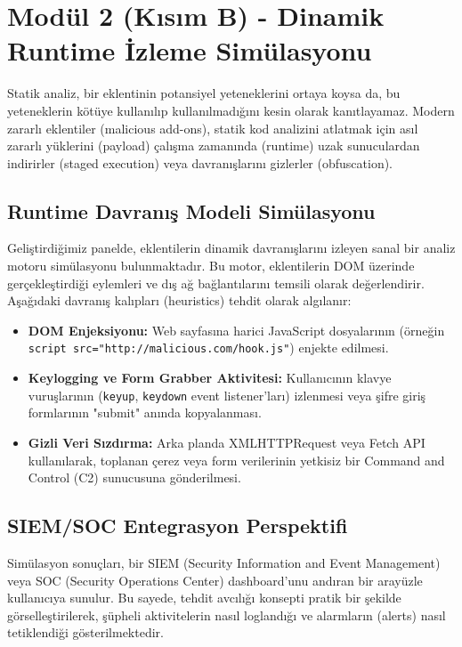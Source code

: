 \documentclass[12pt,a4paper]{article}
\begin{document}
\section{Modül 2 (Kısım B) - Dinamik Runtime İzleme Simülasyonu}

Statik analiz, bir eklentinin potansiyel yeteneklerini ortaya koysa da, bu yeteneklerin kötüye kullanılıp kullanılmadığını kesin olarak kanıtlayamaz. Modern zararlı eklentiler (malicious add-ons), statik kod analizini atlatmak için asıl zararlı yüklerini (payload) çalışma zamanında (runtime) uzak sunuculardan indirirler (staged execution) veya davranışlarını gizlerler (obfuscation).

\subsection{Runtime Davranış Modeli Simülasyonu}
Geliştirdiğimiz panelde, eklentilerin dinamik davranışlarını izleyen sanal bir analiz motoru simülasyonu bulunmaktadır. Bu motor, eklentilerin DOM üzerinde gerçekleştirdiği eylemleri ve dış ağ bağlantılarını temsili olarak değerlendirir. Aşağıdaki davranış kalıpları (heuristics) tehdit olarak algılanır:
\begin{itemize}
    \item \textbf{DOM Enjeksiyonu:} Web sayfasına harici JavaScript dosyalarının (örneğin \texttt{script src="http://malicious.com/hook.js"}) enjekte edilmesi.
    \item \textbf{Keylogging ve Form Grabber Aktivitesi:} Kullanıcının klavye vuruşlarının (\texttt{keyup}, \texttt{keydown} event listener'ları) izlenmesi veya şifre giriş formlarının "submit" anında kopyalanması.
    \item \textbf{Gizli Veri Sızdırma:} Arka planda XMLHTTPRequest veya Fetch API kullanılarak, toplanan çerez veya form verilerinin yetkisiz bir Command and Control (C2) sunucusuna gönderilmesi.
\end{itemize}

\subsection{SIEM/SOC Entegrasyon Perspektifi}
Simülasyon sonuçları, bir SIEM (Security Information and Event Management) veya SOC (Security Operations Center) dashboard'unu andıran bir arayüzle kullanıcıya sunulur. Bu sayede, tehdit avcılığı konsepti pratik bir şekilde görselleştirilerek, şüpheli aktivitelerin nasıl loglandığı ve alarmların (alerts) nasıl tetiklendiği gösterilmektedir.
\clearpage
\end{document}
